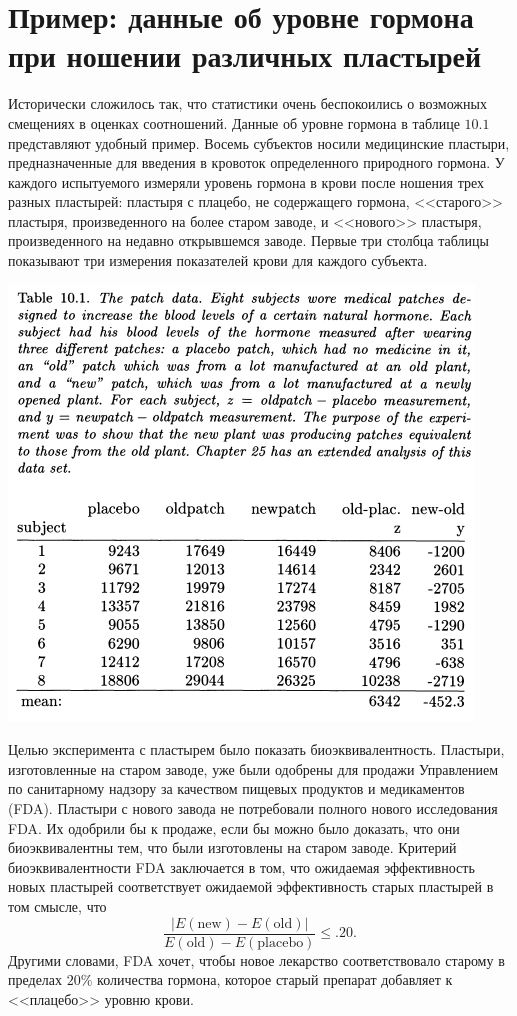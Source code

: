 \section{Пример: данные об уровне гормона при ношении различных пластырей}

Исторически сложилось так, что статистики очень беспокоились о возможных смещениях в оценках соотношений. Данные об уровне гормона в таблице $10.1$ представляют удобный пример. Восемь субъектов носили медицинские пластыри, предназначенные для введения в кровоток определенного природного гормона. У каждого испытуемого измеряли уровень гормона в крови после ношения трех разных пластырей: пластыря с плацебо, не содержащего гормона, <<старого>> пластыря, произведенного на более старом заводе, и <<нового>> пластыря, произведенного на недавно открывшемся заводе. Первые три столбца таблицы показывают три измерения показателей крови для каждого субъекта.

\noindent
\includegraphics[width=\linewidth]{10/t10.1.png}
\newline

Целью эксперимента с пластырем было показать биоэквивалентность. Пластыри, изготовленные на старом заводе, уже были одобрены для продажи Управлением по санитарному надзору за качеством пищевых продуктов и медикаментов (FDA). Пластыри с нового завода не потребовали полного нового исследования FDA. Их одобрили бы к продаже, если бы можно было доказать, что они биоэквивалентны тем, что были изготовлены на старом заводе. Критерий биоэквивалентности FDA заключается в том, что ожидаемая эффективность новых пластырей соответствует ожидаемой эффективность старых пластырей в том смысле, что
\begin{equation}\label{eq10.5}
    \frac{\left|E(\text{new}) - E(\text{old})\right|}{E(\text{old}) - E(\text{placebo})} \leq .20.
\end{equation}
Другими словами, FDA хочет, чтобы новое лекарство соответствовало старому в пределах $20\%$ количества гормона, которое старый препарат добавляет к <<плацебо>> уровню крови.

